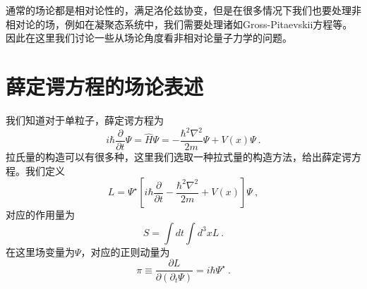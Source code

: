 
通常的场论都是相对论性的，满足洛伦兹协变，但是在很多情况下我们也要处理非相对论的场，例如在凝聚态系统中，我们需要处理诸如Gross-Pitaevskii方程等。因此在这里我们讨论一些从场论角度看非相对论量子力学的问题。
\section{薛定谔方程的场论表述}
我们知道对于单粒子，薛定谔方程为
\begin{equation}
i\hbar \frac{\partial}{\partial t} \Psi = \hat{H} \Psi = -\frac{\hbar^2 \nabla^2}{2m} \Psi + V(x)\Psi ~.
\end{equation}
拉氏量的构造可以有很多种，这里我们选取一种拉式量的构造方法，给出薛定谔方程。我们定义
$$
L =  \Psi^\star [i\hbar \frac{\partial}{\partial t} -\frac{\hbar^2 \nabla^2}{2m} + V(x)]\Psi~,
$$
对应的作用量为
$$
S = \int dt \int d^3 x L~.
$$
在这里场变量为$\Psi$，对应的正则动量为
$$
\pi \equiv \frac{\partial L}{\partial (\partial_t \Psi)} = i\hbar \Psi^\star~.
$$